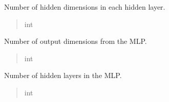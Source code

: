 \documentclass[letterpaper,10pt,english]{sphinxmanual}
\begin{document}
\begin{fulllineitems}
\begin{fulllineitems}
\end{fulllineitems}


\begin{fulllineitems}
\label{\detokenize{index:hypyml.configs.MLPConfig.num_hidden_dim}}
\pysigstartsignatures
{}
\pysigstopsignatures
\sphinxAtStartPar
Number of hidden dimensions in each hidden layer.
\begin{quote}\begin{description}
\sphinxAtStartPar
int

\end{description}\end{quote}

\end{fulllineitems}


\begin{fulllineitems}
\label{\detokenize{index:hypyml.configs.MLPConfig.num_output_dim}}
\pysigstartsignatures
{}
\pysigstopsignatures
\sphinxAtStartPar
Number of output dimensions from the MLP.
\begin{quote}\begin{description}
\sphinxAtStartPar
int

\end{description}\end{quote}

\end{fulllineitems}


\begin{fulllineitems}
\label{\detokenize{index:hypyml.configs.MLPConfig.num_hidden_layers}}
\pysigstartsignatures
{}
\pysigstopsignatures
\sphinxAtStartPar
Number of hidden layers in the MLP.
\begin{quote}\begin{description}
\sphinxAtStartPar
int


\end{description}
\end{quote}
\end{fulllineitems}
\end{fulllineitems}
\end{document}
